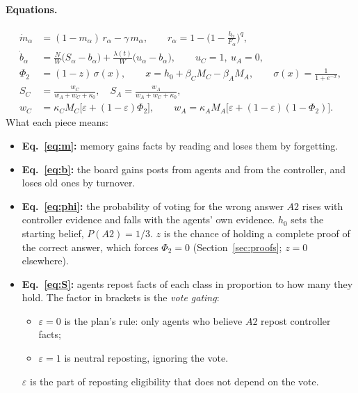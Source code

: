 \documentclass[10pt,a4paper]{article}
\begin{document}
\paragraph{Equations.}
\begin{align}
\dot m_\alpha&=(1-m_\alpha)\,r_\alpha-\gamma\,m_\alpha,\qquad r_\alpha=1-\Big(1-\frac{b_\alpha}{F_\alpha}\Big)^{q},\label{eq:m}\\
\dot b_\alpha&=\frac NW\big(S_\alpha-b_\alpha\big)+\frac{\lambda(t)}{W}\big(u_\alpha-b_\alpha\big),\qquad u_C=1,\ u_A=0,\label{eq:b}\\
\Phi_2&=(1-z)\,\sigma(x),\qquad x=h_0+\beta_C M_C-\beta_A M_A,\qquad \sigma(x)=\frac1{1+e^{-x}},\label{eq:phi}\\
S_C&=\frac{w_C}{w_A+w_C+\kappa_0},\quad S_A=\frac{w_A}{w_A+w_C+\kappa_0},\nonumber\\
w_C&=\kappa_C M_C\big[\varepsilon+(1-\varepsilon)\Phi_2\big],\qquad w_A=\kappa_A M_A\big[\varepsilon+(1-\varepsilon)(1-\Phi_2)\big].\label{eq:S}
\end{align}
What each piece means:
\begin{itemize}
\item \textbf{Eq.~\eqref{eq:m}:} memory gains facts by reading and loses them by forgetting.
\item \textbf{Eq.~\eqref{eq:b}:} the board gains posts from agents and from the controller, and loses old ones by
  turnover.
\item \textbf{Eq.~\eqref{eq:phi}:} the probability of voting for the wrong answer $A2$ rises with controller evidence and
  falls with the agents' own evidence. $h_0$ sets the starting belief, $P(A2)=1/3$. $z$ is the chance of holding a
  complete proof of the correct answer, which forces $\Phi_2=0$ (Section~\ref{sec:proofs}; $z=0$ elsewhere).
\item \textbf{Eq.~\eqref{eq:S}:} agents repost facts of each class in proportion to how many they hold. The factor in
  brackets is the \emph{vote gating}:
  \begin{itemize}
  \item $\varepsilon=0$ is the plan's rule: only agents who believe $A2$ repost controller facts;
  \item $\varepsilon=1$ is neutral reposting, ignoring the vote.
  \end{itemize}
  $\varepsilon$ is the part of reposting eligibility that does not depend on the vote.
\end{itemize}
\end{document}
